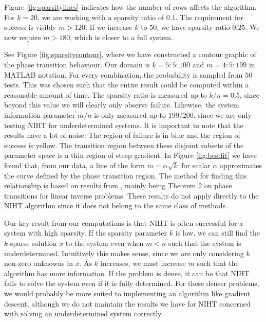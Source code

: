 \documentclass{article}
\begin{document}
Figure \ref{fig:sparsitylines} indicates how the number of rows affects the algorithm.
For $k=20$, we are working with a sparsity ratio of $0.1$. The requirement for success is visibly $m > 120$.
If we increase $k$ to $50$, we have sparsity ratio $0.25$. We now require $m > 180$, which is closer to a full system.

See Figure \ref{fig:sparsitycontour}, where we have constructed a contour graphic of the phase transition behaviour.
Our domain is $k = 5:5:100$ and $m = 4:5:199$ in MATLAB notation.
For every combination, the probability is sampled from $50$ tests.
This was chosen such that the entire result could be computed within a reasonable amount of time.
The sparsity ratio is measured up to $k/n = 0.5$,
since beyond this value we will clearly only observe failure.
Likewise, the system information parameter $m/n$ is only measured up to $199/200$,
since we are only testing NIHT for underdetermined systems.
It is important to note that the results have a lot of noise.
The region of failure is in blue and the region of success is yellow.
The transition region between these disjoint subsets of the parameter space is a thin region of steep gradient. 
In Figure \ref{fig:bestfit} we have found that, from our data, a line of the form $m = \alpha \sqrt{k}$ for scalar $\alpha$ approximates the curve defined by the phase transition region.
The method for finding this relationship is based on results from \cite{amelunxen2014living}, mainly being Theorem 2 on phase transitions for linear inverse problems.
These results do not apply directly to the NIHT algorithm since it does not belong to the same class of methods.


Our key result from our computations is that NIHT is often successful for a system with high sparsity.
If the sparsity parameter $k$ is low, we can still find the $k$-sparse solution $x$ to the system even when $m<n$ such that the system is underdetermined.
Intuitively this makes sense, since we are only considering $k$ non-zero unknowns in $x$.
As $k$ increases, we must increase $m$ such that the algorithm has more information.
If the problem is dense, it can be that NIHT fails to solve the system even if it is fully determined.
For these denser problems, we would probably be more suited to implementing an algorithm like gradient descent,
although we do not maintain the results we have for NIHT concerned with solving an underdetermined system correctly.
\end{document}
